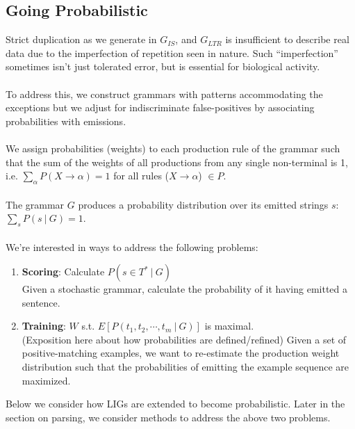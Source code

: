 \documentclass[11pt]{article}
\begin{document}
\subsection{Going Probabilistic}
Strict duplication as we generate in $G_{IS}$, and $G_{LTR}$ is insufficient to describe real data
due to the imperfection of repetition seen in nature. Such ``imperfection'' sometimes isn't just tolerated error, but is essential for biological activity. \cite{Strawbridge2010} \cite{Costello1995} \\ \\
To address this, we construct grammars with patterns accommodating the exceptions but we adjust for indiscriminate false-positives
by associating probabilities with emissions. \\ \\
We assign probabilities (weights) to each production rule of the grammar such that the
sum of the weights of all productions from any single non-terminal is 1,\\
i.e. $\displaystyle\sum\limits_{\alpha}^{} P(X \rightarrow \alpha) = 1$ for all rules ($X \rightarrow \alpha$) $\in P$. \\ \\
The grammar $G$ produces a probability distribution over its emitted strings $s$: $\displaystyle\sum\limits_{s}^{} P(s \ | \ G) = 1$.\\ \\
We're interested in ways to address the following problems:
\begin {enumerate}
 \item {\bf Scoring}: Calculate $P(s \in T^* \ | \ G)$ \\
  Given a stochastic grammar, calculate the probability of it having emitted a sentence.
 \item {\bf Training}: $W$ s.t. $E\left[P(t_1, t_2, \cdots, t_m \ | \ G)\right]$ is maximal. \\
  (Exposition here about how probabilities are defined/refined)
  Given a set of positive-matching examples, we want to re-estimate the production weight distribution 
  such that the probabilities of emitting the example sequence are maximized.
\end {enumerate}
Below we consider how LIGs are extended to become probabilistic. Later in the section on parsing, we consider methods to address the above two problems.
\end{document}
